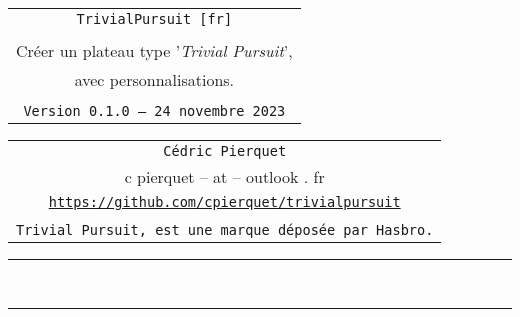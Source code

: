 \documentclass[11pt,a4paper]{ltxdoc}
\def\TPversion{0.1.0}
\def\TPdate{24 novembre 2023}
\begin{document}
\pagestyle{fancy}

\thispagestyle{empty}

\begin{center}
	\begin{minipage}{0.88\linewidth}
	\begin{tcolorbox}[colframe=yellow,colback=yellow!15]
		\begin{center}
			\begin{tabular}{c}
				{\Huge \texttt{TrivialPursuit [fr]}}\\
				\\
				{\LARGE Créer un plateau type '\textit{Trivial Pursuit}',} \\
				{\LARGE avec personnalisations.} \\
				\\
				{\small \texttt{Version \TPversion{} -- \TPdate}}
		\end{tabular}
		\end{center}
	\end{tcolorbox}
\end{minipage}
\end{center}

\begin{center}
	\begin{tabular}{c}
	\texttt{Cédric Pierquet}\\
	{\ttfamily c pierquet -- at -- outlook . fr}\\
	\texttt{\url{https://github.com/cpierquet/trivialpursuit}} \\
	\\
	\texttt{Trivial Pursuit\texttrademark, est une marque déposée par Hasbro.}
\end{tabular}
\end{center}

\hrule

\vfill

\begin{tcolorbox}[colframe=lightgray,colback=lightgray!5]
\PlateauTrivialPursuit
\end{tcolorbox}

\vfill~

\pagebreak


\hypertarget{matoc}{}

\tableofcontents

\vspace*{5mm}

\hrule

\vspace*{5mm}
\end{document}
